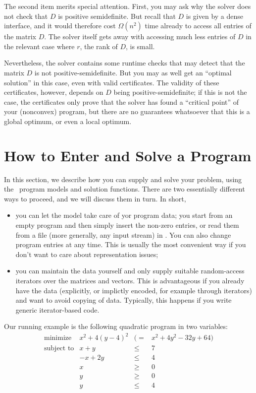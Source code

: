 The second item merits special attention. First, you may ask why the
solver does not check that $D$ is positive semidefinite. But recall
that $D$ is given by a dense interface, and it would therefore cost
$\Omega(n^2)$ time already to access all entries of the matrix $D$.
The solver itself gets away with accessing much less entries of 
$D$ in the relevant case where $r$, the rank of $D$, is small.

Nevertheless, the solver contains some runtime checks
that may detect that the matrix $D$ is not positive-semidefinite. But
you may as well get an ``optimal solution'' in this case, even with
valid certificates. The validity of these certificates, however, 
depends on $D$ being positive-semidefinite; if this is not the case, the
certificates only prove that the solver has found a ``critical point'' of
your (nonconvex) program, but there are no guarantees whatsoever that
this is a global optimum, or even a local optimum.


\section{How to Enter and Solve a Program\label{sec:QP-first}}
In this section, we describe how you can supply and solve your problem, 
using the \cgal\ program models and solution functions. 
There are two essentially different ways to proceed, 
and we will discuss them in turn. In short, 
\begin{itemize}
\item you can let the model take care of yor program data; you start 
from an empty program and then simply insert the non-zero entries, or
read them from a file (more generally, any input stream) in 
. You can also change program entries at any time. 
This is usually the most convenient way if you don't want to care
about representation issues;
\item you can maintain the data yourself and only supply suitable 
random-access iterators over the matrices and vectors. This is 
advantageous if you already have the data (explicitly, or implictly
encoded, for example through iterators) and want to avoid copying 
of data. Typically, this happens if you write generic iterator-based 
code. 
\end{itemize}
 
Our running example is the following quadratic program in two variables:
\[
\begin{array}{lrcl}
\mbox{minimize}       & x^2 + 4(y-4)^2 &(=& x^2 + 4y^2 - 32y + 64) \\
\mbox{subject to}     & x + y &\leq& 7 \\
                      & -x + 2y &\leq& 4 \\
                      & x &\geq& 0 \\
                      & y &\geq& 0 \\
                      & y &\leq& 4
\end{array}
\]

